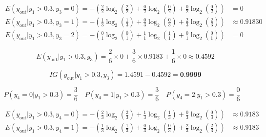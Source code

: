 \documentclass[12pt]{article}
\begin{document}
\begin{enumerate}[leftmargin=\labelsep]
\begin{equation*}
    \begin{aligned}
        E(y_{\text{out}}|y_1 > 0.3, y_3 = 0) = - \left( \frac{2}{2} \log_2 \left( \frac{2}{2} \right) + \frac{0}{2} \log_2 \left( \frac{0}{2} \right) + \frac{0}{2} \log_2 \left( \frac{0}{2} \right) \right) &= 0 
        \\
        E(y_{\text{out}}|y_1 > 0.3, y_3 = 1) = - \left( \frac{1}{3} \log_2 \left( \frac{1}{3} \right) + \frac{0}{3} \log_2 \left( \frac{0}{3} \right) + \frac{2}{3} \log_2 \left( \frac{2}{3} \right) \right) &\approx 0.91830
        \\
        E(y_{\text{out}}|y_1 > 0.3, y_3 = 2) = - \left( \frac{0}{1} \log_2 \left( \frac{0}{1} \right) + \frac{1}{1} \log_2 \left( \frac{1}{1} \right) + \frac{0}{1} \log_2 \left( \frac{0}{1} \right) \right) &= 0
    \end{aligned}
\end{equation*}

\begin{equation*}
    E(y_{\text{out}}|y_1 > 0.3, y_3) = \frac{2}{6} \times  0 + \frac{3}{6} \times 0.9183 + \frac{1}{6} \times 0 \approx 0.4592
\end{equation*}

\begin{equation*}
    IG(y_{\text{out}} | y_1 > 0.3, y_3) = 1.4591 - 0.4592 = \textbf{0.9999}
\end{equation*}

\quad{}

\begin{equation*}
    P(y_4 = 0|y_1 > 0.3) = \frac{3}{6} \quad
    P(y_4 = 1|y_1 > 0.3) = \frac{3}{6} \quad
    P(y_4 = 2|y_1 > 0.3) = \frac{0}{6} \quad
\end{equation*}

\begin{equation*}
    \begin{aligned}
        E(y_{\text{out}}|y_1 > 0.3, y_4 = 0) = - \left( \frac{2}{3} \log_2 \left( \frac{2}{3} \right) + \frac{1}{3} \log_2 \left( \frac{1}{3} \right) + \frac{0}{3} \log_2 \left( \frac{0}{3} \right) \right) &\approx 0.9183 
        \\
        E(y_{\text{out}}|y_1 > 0.3, y_4 = 1) = - \left( \frac{1}{3} \log_2 \left( \frac{1}{3} \right) + \frac{0}{3} \log_2 \left( \frac{0}{3} \right) + \frac{2}{3} \log_2 \left( \frac{2}{3} \right) \right) &\approx 0.9183
        \\
    \end{aligned}
\end{equation*}


\end{enumerate}
\end{document}
